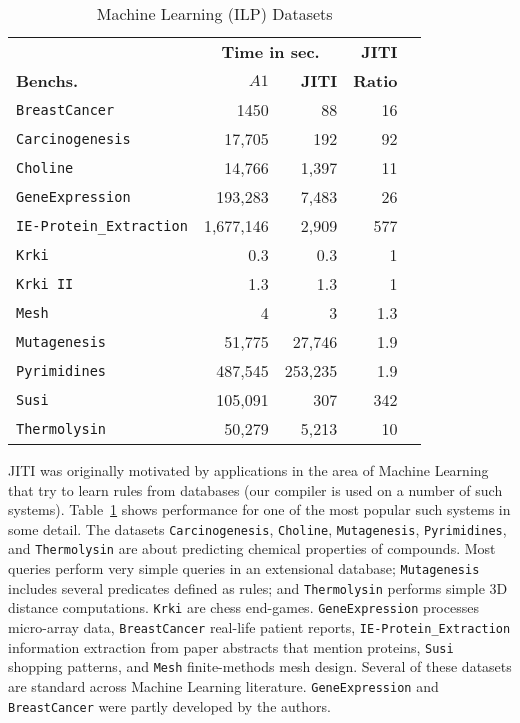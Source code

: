 \documentclass{llncs}
\begin{document}
\begin{table}[ht]
  \centering
  \begin {tabular}{|l|r|r|r|r|} \hline %
    &  \multicolumn{2}{|c|}{\bf Time in sec.}  & \bf JITI \\
    {\bf Benchs.}  & \bf $A1$   & \bf JITI & \bf Ratio \\
    \hline
    \texttt{BreastCancer}      & 1450    & 88 & 16\\
    \texttt{Carcinogenesis}    & 17,705    & 192  &92\\
    \texttt{Choline}           & 14,766    & 1,397  & 11  \\
    \texttt{GeneExpression}    & 193,283     & 7,483    & 26    \\
    \texttt{IE-Protein\_Extraction} &  1,677,146      & 2,909    & 577    \\
    \texttt{Krki}              & 0.3        & 0.3      & 1      \\
    \texttt{Krki II}           & 1.3     & 1.3     & 1     \\
    \texttt{Mesh}              & 4    & 3  & 1.3  \\
    \texttt{Mutagenesis}       & 51,775  & 27,746 & 1.9\\
    \texttt{Pyrimidines}       & 487,545     & 253,235  & 1.9    \\
    \texttt{Susi}              & 105,091    & 307    & 342  \\
    \texttt{Thermolysin}       & 50,279      &  5,213     & 10      \\
    \hline
\end{tabular}
\caption{Machine Learning (ILP) Datasets}
\label{tab:aleph}
\end{table}



JITI was originally motivated by applications in the area of Machine
Learning that try to learn rules from databases (our compiler is used
on a number of such systems). Table~\ref{tab:aleph} shows performance
for one of the most popular such systems in some detail.  The datasets
\texttt{Carcinogenesis}, \texttt{Choline}, \texttt{Mutagenesis},
\texttt{Pyrimidines}, and \texttt{Thermolysin} are about predicting
chemical properties of compounds. Most queries perform very simple
queries in an extensional database; \texttt{Mutagenesis} includes
several predicates defined as rules; and \texttt{Thermolysin} performs
simple 3D distance computations.  \texttt{Krki} are chess end-games.
\texttt{GeneExpression} processes micro-array data,
\texttt{BreastCancer} real-life patient reports,
\texttt{IE-Protein\_Extraction} information extraction from paper
abstracts that mention proteins, \texttt{Susi} shopping patterns, and
\texttt{Mesh} finite-methods mesh design. Several of these datasets
are standard across Machine Learning literature.
\texttt{GeneExpression} and \texttt{BreastCancer} were partly
developed by the authors.
\end{document}
